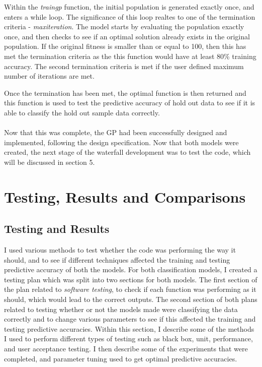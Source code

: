 \documentclass[11pt]{article}
\begin{document}
Within the \textit{train\textunderscore gp} function, the initial population is generated exactly once, and enters a while loop. The significance of this loop realtes to one of the termination criteria - \textit{max\textunderscore iteration}. The model starts by evaluating the population exactly once, and then checks to see if an optimal solution already exists in the original population. If the original fitness is smaller than or equal to 100, then this has met the termination criteria as the this function would have at least 80\% training accuracy. The second termination criteria is met if the user defined maximum number of iterations are met. 

Once the termination has been met, the optimal function is then returned and this function is used to test the predictive accuracy of hold out data to see if it is able to classify the hold out sample data correctly. \\\\
Now that this was complete, the GP had been successfully designed and implemented, following the design specification. Now that both models were created, the next stage of the waterfall development was to test the code, which will be discussed in section 5. 
\section{Testing, Results and Comparisons} %
\subsection{Testing and Results}
I used various methods to test whether the code was performing the way it should, and to see if different techniques affected the training and testing predictive accuracy of both the models. For both classification models, I created a testing plan which was split into two sections for both models. The first section of the plan related to \textit{software testing}, to check if each function was performing as it should, which would lead to the correct outputs. The second section of both plans related to testing whether or not the models made were classifying the data correctly and to change various parameters to see if this affected the training and testing predictive accuracies. Within this section, I describe some of the methods I used to perform different types of testing such as black box, unit, performance, and user acceptance testing. I then describe some of the experiments that were completed, and parameter tuning used to get optimal predictive accuracies.  \\
\end{document}
